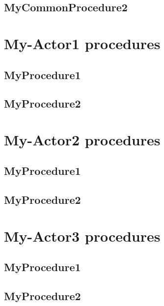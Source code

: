 \subsection{MyCommonProcedure2}


\section{My-Actor1 procedures}

\subsection{MyProcedure1}

\subsection{MyProcedure2}




\section{My-Actor2 procedures}
\subsection{MyProcedure1}
\subsection{MyProcedure2}


\section{My-Actor3 procedures}

\subsection{MyProcedure1}
\subsection{MyProcedure2}















